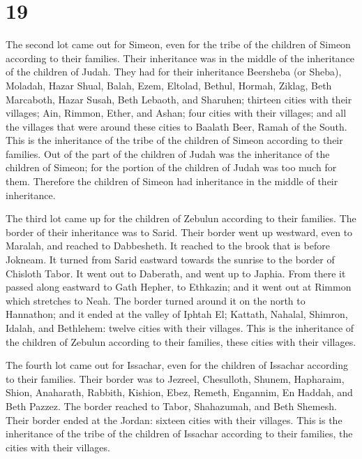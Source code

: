 \hypertarget{section-18}{%
\section{19}\label{section-18}}

 The second lot came out for Simeon, even for the tribe of
the children of Simeon according to their families. Their inheritance
was in the middle of the inheritance of the children of Judah.
 They had for their inheritance Beersheba (or Sheba),
Moladah,  Hazar Shual, Balah, Ezem,  Eltolad,
Bethul, Hormah,  Ziklag, Beth Marcaboth, Hazar Susah,
 Beth Lebaoth, and Sharuhen; thirteen cities with their
villages;  Ain, Rimmon, Ether, and Ashan; four cities with
their villages;  and all the villages that were around these
cities to Baalath Beer, Ramah of the South. This is the inheritance of
the tribe of the children of Simeon according to their families.
 Out of the part of the children of Judah was the
inheritance of the children of Simeon; for the portion of the children
of Judah was too much for them. Therefore the children of Simeon had
inheritance in the middle of their inheritance.

 The third lot came up for the children of Zebulun
according to their families. The border of their inheritance was to
Sarid.  Their border went up westward, even to Maralah, and
reached to Dabbesheth. It reached to the brook that is before Jokneam.
 It turned from Sarid eastward towards the sunrise to the
border of Chisloth Tabor. It went out to Daberath, and went up to
Japhia.  From there it passed along eastward to Gath
Hepher, to Ethkazin; and it went out at Rimmon which stretches to Neah.
 The border turned around it on the north to Hannathon; and
it ended at the valley of Iphtah El;  Kattath, Nahalal,
Shimron, Idalah, and Bethlehem: twelve cities with their villages.
 This is the inheritance of the children of Zebulun
according to their families, these cities with their villages.

 The fourth lot came out for Issachar, even for the
children of Issachar according to their families.  Their
border was to Jezreel, Chesulloth, Shunem,  Hapharaim,
Shion, Anaharath,  Rabbith, Kishion, Ebez, 
Remeth, Engannim, En Haddah, and Beth Pazzez.  The border
reached to Tabor, Shahazumah, and Beth Shemesh. Their border ended at
the Jordan: sixteen cities with their villages.  This is
the inheritance of the tribe of the children of Issachar according to
their families, the cities with their villages.

